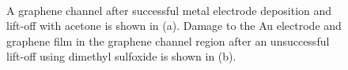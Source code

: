 \documentclass[
  a4paper,
]{scrbook}
\begin{document}
\begin{figure}
\begin{minipage}[t]{0.45\linewidth}
{{}

}

\end{minipage}%
%
\begin{minipage}[t]{0.01\linewidth}

{\centering 

~

}

\end{minipage}%

\caption{\label{fig-microscope-electrodes}A graphene channel after
successful metal electrode deposition and lift-off with acetone is shown
in (a). Damage to the Au electrode and graphene film in the graphene
channel region after an unsuccessful lift-off using dimethyl sulfoxide
is shown in (b).}

\end{figure}
\end{document}
